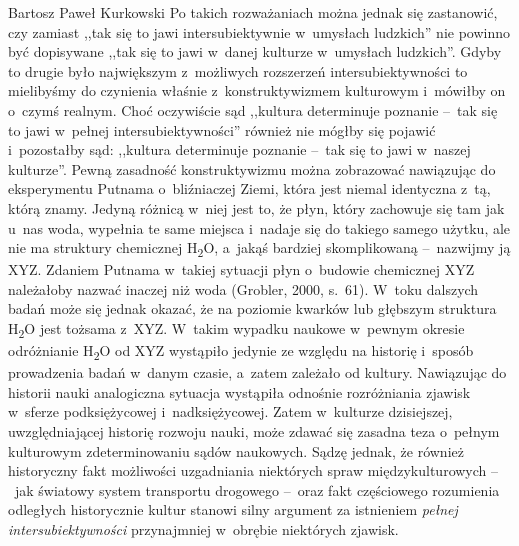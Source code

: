 \begin{artplenv}{Bartosz Paweł Kurkowski}
Po takich rozważaniach można jednak się zastanowić, czy zamiast ,,tak się to jawi intersubiektywnie w~umysłach ludzkich''
nie powinno być dopisywane ,,tak się to jawi w~danej kulturze w~umysłach ludzkich''. Gdyby to drugie było
największym z~możliwych rozszerzeń intersubiektywności to mielibyśmy do czynienia właśnie z~konstruktywizmem kulturowym
i~mówiłby on o~czymś realnym. Choć oczywiście sąd ,,kultura determinuje poznanie --~tak się to jawi w~pełnej intersubiektywności''
również nie mógłby się pojawić i~pozostałby sąd: ,,kultura determinuje poznanie --~tak się to jawi w~naszej kulturze''.
Pewną zasadność konstruktywizmu można zobrazować nawiązując do eksperymentu Putnama o~bliźniaczej Ziemi, która jest
niemal identyczna z~tą, którą znamy. Jedyną różnicą w~niej jest to, że płyn, który zachowuje się tam jak u~nas woda,
wypełnia te same miejsca i~nadaje się do takiego samego użytku, ale nie ma struktury chemicznej H\textsubscript{2}O,
a~jakąś bardziej skomplikowaną --~nazwijmy ją XYZ. Zdaniem Putnama w~takiej sytuacji płyn o~budowie chemicznej XYZ
należałoby nazwać inaczej niż woda \label{ref:RNDlEIwsbm0x8}(Grobler, 2000, s.~61). W~toku dalszych badań może się
jednak okazać, że na poziomie kwarków lub głębszym struktura H\textsubscript{2}O jest tożsama z~XYZ. W~takim wypadku
naukowe w~pewnym okresie odróżnianie H\textsubscript{2}O od XYZ wystąpiło jedynie ze względu na historię i~sposób
prowadzenia badań w~danym czasie, a~zatem zależało od kultury. Nawiązując do historii nauki analogiczna sytuacja
wystąpiła odnośnie rozróżniania zjawisk w~sferze podksiężycowej i~nadksiężycowej. Zatem w~kulturze dzisiejszej,
uwzględniającej historię rozwoju nauki, może zdawać się zasadna teza o~pełnym kulturowym zdeterminowaniu sądów
naukowych. Sądzę jednak, że również historyczny fakt możliwości uzgadniania niektórych spraw międzykulturowych --~jak
światowy system transportu drogowego --~oraz fakt częściowego rozumienia odległych historycznie kultur stanowi silny
argument za istnieniem \textit{pełnej intersubiektywności} przynajmniej w~obrębie niektórych zjawisk.



\end{artplenv}
